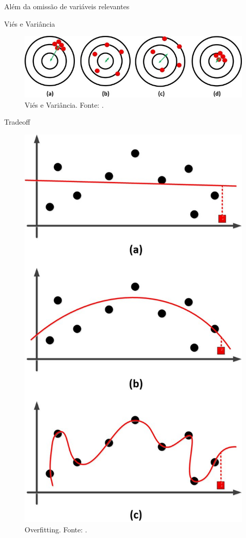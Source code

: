 \documentclass[9pt,ignorenonframetext,aspectratio=169]{beamer}
\begin{document}
\begin{frame}{Além da omissão de variáveis relevantes}
\protect\hypertarget{aluxe9m-da-omissuxe3o-de-variuxe1veis-relevantes}{}

\begin{block}{Viés e Variância}

\begin{figure}

{\centering \includegraphics[width=0.7\linewidth]{../../images/The-dart-example} 

}

\caption{Viés e Variância. Fonte: \textcite{ghojogh2019theory}.}\label{fig:unnamed-chunk-6}
\end{figure}

\end{block}

\end{frame}

\begin{frame}{Tradeoff}
\protect\hypertarget{tradeoff}{}

\begin{figure}

{\centering \includegraphics[width=0.25\linewidth]{../../images/An-example-for-a-underfitting-b-good-fit-and-c-overfitting-The-black-circles-and_W640} 

}

\caption{Overfitting. Fonte: \textcite{ghojogh2019theory}.}\label{fig:unnamed-chunk-7}
\end{figure}

\end{frame}
\end{document}
